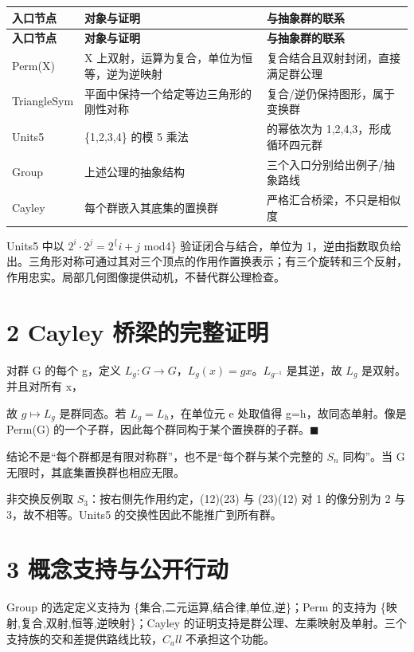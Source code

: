 \documentclass[UTF8,a4paper,zihao=-4,fontset=windows,openany]{ctexbook}
\newcommand{\mcsdisplay}[1]{%
  \par\addvspace{0.7em}%
  \sbox{\mcsmathbox}{\ensuremath{\displaystyle #1}}%
  \ifdim\wd\mcsmathbox>\linewidth
    \noindent\resizebox{\linewidth}{!}{\usebox{\mcsmathbox}}%
  \else
    \noindent\hspace*{\fill}\usebox{\mcsmathbox}\hspace*{\fill}%
  \fi
  \par\addvspace{0.7em}%
}
\def\ensuremath#1{#1}%
\def\mathrm#1{#1}%
\begin{document}
\begingroup\small\setlength{\tabcolsep}{4pt}
\begin{longtable}{>{\raggedright\arraybackslash}p{}>{\raggedright\arraybackslash}p{}>{\raggedright\arraybackslash}p{}}
\toprule
\textbf{入口节点} & \textbf{对象与证明} & \textbf{与抽象群的联系} \\
\midrule
\endfirsthead
\toprule
\textbf{入口节点} & \textbf{对象与证明} & \textbf{与抽象群的联系} \\
\midrule
\endhead
\bottomrule
\endfoot
\bottomrule
\endlastfoot
Perm(X) & X 上双射，运算为复合，单位为恒等，逆为逆映射 & 复合结合且双射封闭，直接满足群公理 \\
TriangleSym & 平面中保持一个给定等边三角形的刚性对称 & 复合/逆仍保持图形，属于变换群 \\
Units5 & \{1,2,3,4\} 的模 5 乘法 & 2 的幂依次为 1,2,4,3，形成循环四元群 \\
Group & 上述公理的抽象结构 & 三个入口分别给出例子/抽象路线 \\
Cayley & 每个群嵌入其底集的置换群 & 严格汇合桥梁，不只是相似度 \\
\end{longtable}
\endgroup

Units5 中以 \(2^i\cdot 2^j=2^\{i+j\) mod4\} 验证闭合与结合，单位为 1，逆由指数取负给出。三角形对称可通过其对三个顶点的作用作置换表示；有三个旋转和三个反射，作用忠实。局部几何图像提供动机，不替代群公理检查。

\section{2 Cayley 桥梁的完整证明}
对群 G 的每个 g，定义 \(L_g:G\to G\)，\(L_g(x)=\mathrm{gx}\)。\(L_{g^{-1}}\) 是其逆，故 \(L_g\) 是双射。并且对所有 x，


\mcsdisplay{(L_g\circ L_h)(x)=g(hx)=(gh)x=L_{gh}(x).}
\noindent 故 \(g\mapsto L_g\) 是群同态。若 \(L_g=L_h\)，在单位元 e 处取值得 g=h，故同态单射。像是 Perm(G) 的一个子群，因此每个群同构于某个置换群的子群。\(\blacksquare\)

结论不是“每个群都是有限对称群”，也不是“每个群与某个完整的 \(S_n\) 同构”。当 G 无限时，其底集置换群也相应无限。

非交换反例取 \(S_{3}\)：按右侧先作用约定，(12)(23) 与 (23)(12) 对 1 的像分别为 2 与 3，故不相等。Units5 的交换性因此不能推广到所有群。

\section{3 概念支持与公开行动}
Group 的选定定义支持为 \{集合,二元运算,结合律,单位,逆\}；Perm 的支持为 \{映射,复合,双射,恒等,逆映射\}；Cayley 的证明支持是群公理、左乘映射及单射。三个支持族的交和差提供路线比较，\(C_\mathrm{all}\) 不承担这个功能。
\end{document}
